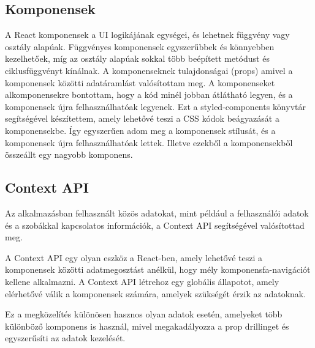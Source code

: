 \subsection{Komponensek}
A React komponensek a UI logikájának egységei, és lehetnek függvény vagy osztály alapúak. Függvényes komponensek egyszerűbbek és könnyebben kezelhetőek, míg az osztály alapúak sokkal több beépített metódust és ciklusfüggvényt kínálnak.
A komponenseknek tulajdonságai (props) amivel a komponensek közötti adatáramlást valósítottam meg.
A komponenseket alkomponensekre bontottam, hogy a kód minél jobban átlátható legyen, és a komponensek újra felhasználhatóak legyenek.
Ezt a  styled-components \cite[]{styled-components} könyvtár segítségével készítettem, amely lehetővé teszi a CSS kódok beágyazását a komponensekbe.
Így egyszerűen adom meg a komponensek stílusát, és a komponensek újra felhasználhatóak lettek.
Illetve ezekből a komponensekből összeállt egy nagyobb komponens.
\vspace{1em}
\subsection{Context API}
Az alkalmazásban felhasznált közös adatokat, mint például a felhasználói adatok és a szobákkal kapcsolatos információk, a Context API segítségével valósítottad meg.

A Context API egy olyan eszköz a React-ben, amely lehetővé teszi a komponensek közötti adatmegosztást anélkül, hogy mély komponensfa-navigációt kellene alkalmazni. A Context API létrehoz egy globális állapotot, amely elérhetővé válik a komponensek számára, amelyek szükségét érzik az adatoknak.

Ez a megközelítés különösen hasznos olyan adatok esetén, amelyeket több különböző komponens is használ, mivel megakadályozza a prop drillinget és egyszerűsíti az adatok kezelését.

